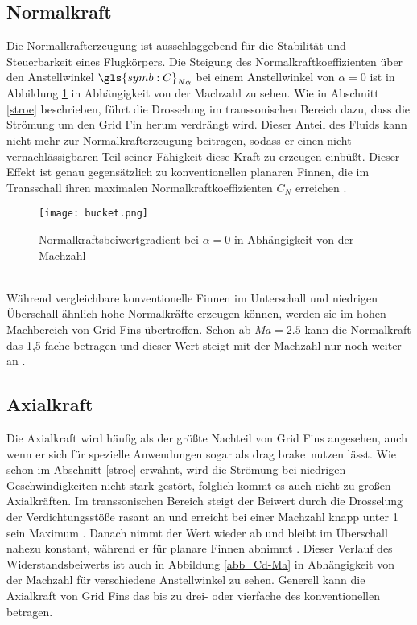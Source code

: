 \subsection{Normalkraft}
Die Normalkrafterzeugung ist ausschlaggebend für die Stabilität und Steuerbarkeit eines Flugkörpers. Die Steigung des Normalkraftkoeffizienten über den Anstellwinkel $\gls{symb:C}_{N\alpha}$ bei einem Anstellwinkel von $\alpha = 0$ ist in Abbildung \ref{abb_bucket} in Abhängigkeit von der Machzahl zu sehen. Wie in Abschnitt \ref{stroe} beschrieben, führt die Drosselung im transsonischen Bereich dazu, dass die Strömung um den Grid Fin herum verdrängt wird. Dieser Anteil des Fluids kann nicht mehr zur Normalkrafterzeugung beitragen, sodass er einen nicht vernachlässigbaren Teil seiner Fähigkeit diese Kraft zu erzeugen einbüßt. Dieser Effekt ist genau gegensätzlich zu konventionellen planaren Finnen, die im Transschall ihren maximalen Normalkraftkoeffizienten $C_N$ erreichen \cite{synopsis}.
\begin{figure}[h]
	\centering
	\texttt{[image: bucket.png]}
	\begin{flushright}
	\end{flushright}
	\caption{Normalkraftsbeiwertgradient bei $\alpha = 0$ in Abhängigkeit von der Machzahl}
	\label{abb_bucket}
\end{figure}\\
Während vergleichbare konventionelle Finnen im Unterschall und niedrigen Überschall ähnlich hohe Normalkräfte erzeugen können, werden sie im hohen Machbereich von Grid Fins übertroffen. Schon ab $Ma=2.5$ kann die Normalkraft das 1,5-fache betragen und dieser Wert steigt mit der Machzahl nur noch weiter an \cite{synopsis,vergleichPlanarNATO}.
\subsection{Axialkraft}
Die Axialkraft wird häufig als der größte Nachteil von Grid Fins angesehen, auch wenn er sich für spezielle Anwendungen sogar als \grqq drag brake\grqq \ nutzen lässt. Wie schon im Abschnitt \ref{stroe} erwähnt, wird die Strömung bei niedrigen Geschwindigkeiten nicht stark gestört, folglich kommt es auch nicht zu großen Axialkräften. Im transsonischen Bereich steigt der Beiwert durch die Drosselung der Verdichtungsstöße rasant an und erreicht bei einer Machzahl knapp unter 1 sein Maximum \cite{solver}. Danach nimmt der Wert wieder ab und bleibt im Überschall nahezu konstant, während er für planare Finnen abnimmt \cite{vergleichPlanarNATO}. Dieser Verlauf des Widerstandsbeiwerts ist auch in Abbildung \ref{abb_Cd-Ma} in Abhängigkeit von der Machzahl für verschiedene Anstellwinkel zu sehen. Generell kann die Axialkraft von Grid Fins das bis zu drei- oder  vierfache des konventionellen betragen.
